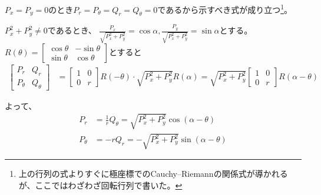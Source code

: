 $P_x=P_y=0$のとき$P_r=P_\theta=Q_r=Q_\theta=0$であるから示すべき式が成り立つ\footnote{上の行列の式よりすぐに極座標でのCauchy--Riemannの関係式が導かれるが、ここではわざわざ回転行列で書いた。}。

$P_x^2+P_y^2\neq0$であるとき、
$\frac{P_x}{\sqrt{P_x^2+P_y^2}}=\cos\alpha,
\frac{P_y}{\sqrt{P_x^2+P_y^2}}=\sin\alpha$とする。
$R(\theta)=
\begin{bmatrix}
    \cos\theta & -\sin\theta\\
    \sin\theta & \cos\theta
\end{bmatrix}$とすると
\begin{align*}
    \begin{bmatrix}
        P_r & Q_r\\
        P_\theta & Q_\theta
    \end{bmatrix}
    &=
    \begin{bmatrix}
        1 & 0\\
        0 & r
    \end{bmatrix}
    R(-\theta)\cdot\sqrt{P_x^2+P_y^2}R(\alpha)
    =\sqrt{P_x^2+P_y^2}
    \begin{bmatrix}
        1 & 0\\
        0 & r
    \end{bmatrix}
    R(\alpha-\theta)
\end{align*}

よって、
\begin{align*}
    P_r&=\frac{1}{r}Q_\theta=\sqrt{P_x^2+P_y^2}\cos(\alpha-\theta)\\
    P_\theta&=-rQ_r=-\sqrt{P_x^2+P_y^2}\sin(\alpha-\theta)
\end{align*}

